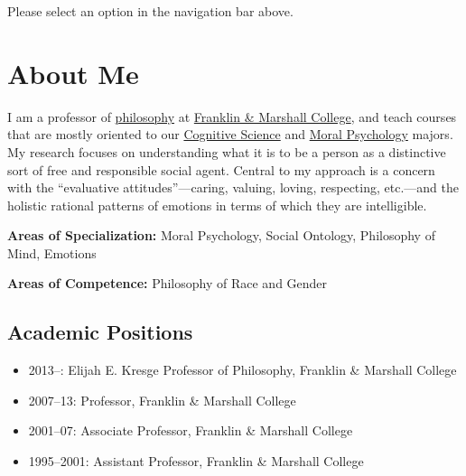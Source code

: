 \documentclass[%
  11pt,%
]{article}
\begin{document}

\tableofcontents

\ifdefined\HCode

    \begin{center}
      Please select an option in the navigation bar above.

    \end{center}
\fi

\section{About Me}

I am a professor of \href{https://www.fandm.edu/fields-of-study/philosophy/index.html}{philosophy} at \href{www.fandm.edu}{Franklin \& Marshall College}, and teach courses that are mostly oriented to our \href{https://www.fandm.edu/fields-of-study/cognitive-science/index.html}{Cognitive Science} and \href{https://www.fandm.edu/fields-of-study/moral-psychology/index.html}{Moral Psychology} majors. My research focuses on understanding what it is to be a person as a distinctive sort of free and responsible social agent. Central to my approach is a concern with the \enquote{evaluative attitudes}---caring, valuing, loving, respecting, etc.---and the holistic rational patterns of emotions in terms of which they are intelligible.

\noindent\textbf{Areas of Specialization:} Moral Psychology, Social Ontology, Philosophy of Mind, Emotions

\noindent\textbf{Areas of Competence:} Philosophy of Race and Gender

\subsection*{Academic Positions}

\begin{itemize}
  \item 2013--: Elijah E. Kresge Professor of Philosophy, Franklin \& Marshall College
  \item 2007--13: Professor, Franklin \& Marshall College
  \item 2001--07: Associate Professor, Franklin \& Marshall College
  \item 1995--2001: Assistant Professor, Franklin \& Marshall College
\end{itemize}
\end{document}
